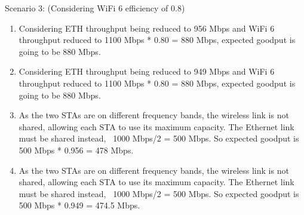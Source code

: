 \begin{solution}
    Scenario 3:
    (Considering WiFi 6 efficiency of 0.8)
    \begin{enumerate}
        \item Considering ETH throughput being reduced to 956 Mbps and WiFi 6 throughput reduced to 1100 Mbps * 0.80 = 880 Mbps, expected goodput is going to be 880 Mbps.
        \item Considering ETH throughput being reduced to 949 Mbps and WiFi 6 throughput reduced to 1100 Mbps * 0.80 = 880 Mbps, expected goodput is going to be 880 Mbps.
        \item As the two STAs are on different frequency bands, the wireless link is not shared, allowing each STA to use its maximum capacity. The Ethernet link must be shared instead, ~1000 Mbps/2 = 500 Mbps. So expected goodput is 500 Mbps * 0.956 = 478 Mbps.
        \item As the two STAs are on different frequency bands, the wireless link is not shared, allowing each STA to use its maximum capacity. The Ethernet link must be shared instead, ~1000 Mbps/2 = 500 Mbps. So expected goodput is 500 Mbps * 0.949 = 474.5 Mbps.
    \end{enumerate}
\end{solution}





